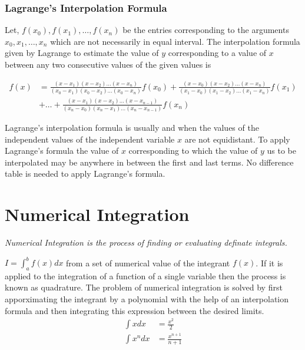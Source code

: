 \documentclass[10pt, twoside, a4paper]{article}
\begin{document}
\subsubsection{Lagrange's Interpolation Formula}%
Let, $f(x_0),f(x_1),\dots,f(x_n)$ be the entries corresponding to the
arguments $x_0, x_1,\dots,x_n$ which are not necessarily in equal interval.
The interpolation formula given by Lagrange to estimate the value of $y$
corresponding to a value of $x$ between any two consecutive values of the
given values is
\begin{tcolorbox}
  \begin{align*}
    f(x) &= \frac{(x-x_1)(x-x_2)
             \dots(x-x_n)}{(x_0-x_1)(x_0-x_2)
             \dots(x_0-x_n)}f(x_0)
          + \frac{(x-x_0)(x-x_2)
             \dots(x-x_n)}{(x_1-x_0)(x_1-x_2)
             \dots(x_1-x_n)}f(x_1)\\
         &+ \dots 
          + \frac{(x-x_1)(x-x_2)
             \dots(x-x_{n-1})}{(x_n-x_0)(x_n-x_1)
             \dots(x_n-x_{n-1})}f(x_n)
  \end{align*}
\end{tcolorbox}

Lagrange's interpolation formula is usually and when the values of the
independent values of the independent variable $x$ are not equidistant. To 
apply Lagrange's formula the value of $x$ corresponding to which the value of
$y$ us to be interpolated may be anywhere in between the first and last terms.
No difference table is needed to apply Lagrange's formula.%


\section{Numerical Integration}%
\begin{center}
  \emph{Numerical Integration is the process of finding or evaluating definate
  integrals.}
\end{center}

$I=\int_{a}^bf(x)dx$ from a set of numerical value of the integrant $f(x)$. If 
it is applied to the integration of a function of a single variable then the
process is known as quadrature. The problem of numerical integration is solved 
by first apporximating the integrant by a polynomial with the help of an
interpolation formula and then integrating this expression between the desired
limits.
\begin{align*}
  \int xdx   &= \frac{x^2}{2}\\
  \int x^ndx &= \frac{x^{n+1}}{n+1}
\end{align*}
\end{document}
